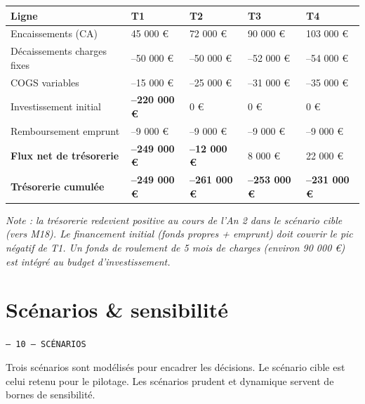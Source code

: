 \documentclass[11pt, a4paper]{article}
\newcommand{\eyebrow}[1]{%
  \vspace{4pt}
  {\small\color{fc-ink3}\texttt{— #1}}
  \vspace{2pt}
}
\newcommand{\redcell}[1]{\textcolor{fc-red}{\textbf{#1}}}
\begin{document}
\begin{center}
\begin{tabular}{@{}p{5.5cm}p{2cm}p{2cm}p{2cm}p{2cm}@{}}
\toprule
\rowcolor{fc-ink}\color{white}\textbf{Ligne} & \color{white}\textbf{T1} & \color{white}\textbf{T2} & \color{white}\textbf{T3} & \color{white}\textbf{T4} \\
\midrule
Encaissements (CA) & 45 000 € & 72 000 € & 90 000 € & 103 000 € \\
\rowcolor{fc-bg2} Décaissements charges fixes & –50 000 € & –50 000 € & –52 000 € & –54 000 € \\
COGS variables & –15 000 € & –25 000 € & –31 000 € & –35 000 € \\
\rowcolor{fc-bg2} Investissement initial & \redcell{–220 000 €} & 0 € & 0 € & 0 € \\
Remboursement emprunt & –9 000 € & –9 000 € & –9 000 € & –9 000 € \\
\midrule
\textbf{Flux net de trésorerie} & \redcell{–249 000 €} & \redcell{–12 000 €} & 8 000 € & 22 000 € \\
\rowcolor{fc-bg2} \textbf{Trésorerie cumulée} & \redcell{–249 000 €} & \redcell{–261 000 €} & \redcell{–253 000 €} & \redcell{–231 000 €} \\
\bottomrule
\end{tabular}
\end{center}

\vspace{8pt}
{\small\color{fc-ink3}\textit{Note : la trésorerie redevient positive au cours de l'An 2 dans le scénario cible (vers M18). Le financement initial (fonds propres + emprunt) doit couvrir le pic négatif de T1. Un fonds de roulement de 5 mois de charges (environ 90 000 €) est intégré au budget d'investissement.}}

\section{Scénarios \& sensibilité}
\eyebrow{10 — SCÉNARIOS}

Trois scénarios sont modélisés pour encadrer les décisions. Le scénario cible est celui retenu pour le pilotage. Les scénarios prudent et dynamique servent de bornes de sensibilité.
\end{document}
